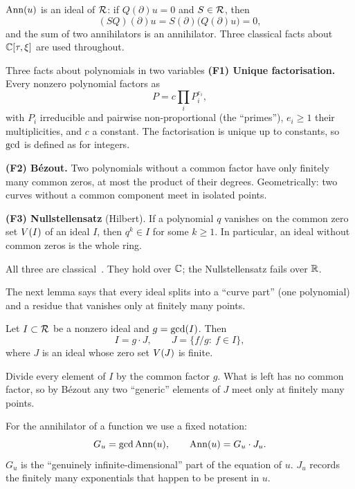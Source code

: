 $\operatorname{Ann}(u)$ is an ideal of $\mathcal{R}$: if $Q(\partial)u=0$ and $S\in\mathcal{R}$, then
\[
(SQ)(\partial)u=S(\partial)\big(Q(\partial)u\big)=0 ,
\]
and the sum of two annihilators is an annihilator. Three classical facts about $\mathbb{C}[\tau,\xi]$ are used throughout.

\begin{notebox}{Three facts about polynomials in two variables}
\textbf{(F1) Unique factorisation.} Every nonzero polynomial factors as
\[
P=c\prod_iP_i^{e_i},
\]
with $P_i$ irreducible and pairwise non-proportional (the ``primes''), $e_i\ge1$ their multiplicities, and $c$ a constant. The factorisation is unique up to constants, so $\operatorname{gcd}$ is defined as for integers.

\textbf{(F2) B\'ezout.} Two polynomials without a common factor have only finitely many common zeros, at most the product of their degrees. Geometrically: two curves without a common component meet in isolated points.

\textbf{(F3) Nullstellensatz} (Hilbert). If a polynomial $q$ vanishes on the common zero set $V(I)$ of an ideal $I$, then $q^k\in I$ for some $k\ge1$. In particular, an ideal without common zeros is the whole ring.
\end{notebox}

All three are classical~\cite{clo,fu}. They hold over $\mathbb{C}$; the Nullstellensatz fails over $\mathbb{R}$.

The next lemma says that every ideal splits into a ``curve part'' (one polynomial) and a residue that vanishes only at finitely many points.

\begin{lemma}\label{f:lem:gcd}
Let $I\subset\mathcal{R}$ be a nonzero ideal and $g=\operatorname{gcd}(I)$. Then
\[
I=g\cdot J,\qquad J=\{f/g:\ f\in I\},
\]
where $J$ is an ideal whose zero set $V(J)$ is finite.

\end{lemma}

\begin{intuition}
Divide every element of $I$ by the common factor $g$. What is left has no common factor, so by B\'ezout any two ``generic'' elements of $J$ meet only at finitely many points.
\end{intuition}

For the annihilator of a function we use a fixed notation:
\[
G_u=\operatorname{gcd}\operatorname{Ann}(u),\qquad \operatorname{Ann}(u)=G_u\cdot J_u .
\]
$G_u$ is the ``genuinely infinite-dimensional'' part of the equation of $u$. $J_u$ records the finitely many exponentials that happen to be present in $u$.

